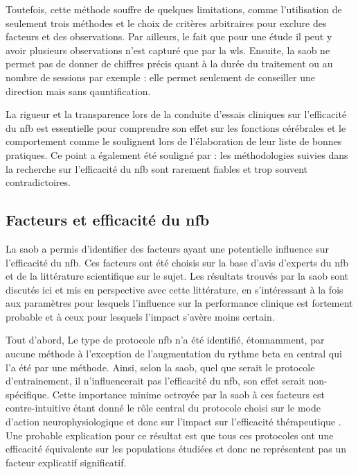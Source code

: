 Toutefois, cette méthode souffre de quelques limitations, comme 
l'utilisation de seulement trois méthodes et le choix de critères arbitraires pour exclure des facteurs et des observations. Par ailleurs, le fait que pour une étude il peut y 
avoir plusieurs observations n'est capturé que par la \gls{wls}. Ensuite, la \gls{saob} ne permet pas de donner de chiffres précis quant à la durée du traitement ou au 
nombre de sessions par exemple : elle permet seulement de conseiller une direction mais sans qauntification.

La rigueur et la transparence lors de la conduite d'essais cliniques sur l'efficacité
du \gls{nfb} est essentielle pour comprendre son effet sur les fonctions cérébrales et le comportement comme le soulignent \citet{Ros2019} lors de l'élaboration
de leur liste de bonnes pratiques. Ce point a également été souligné par \citet{Rogala2016} : les méthodologies suivies dans la recherche sur l'efficacité du
\gls{nfb} sont rarement fiables et trop souvent contradictoires.

\subsection{Facteurs et efficacité du \gls{nfb}} \label{discussion_factors}

La \gls{saob} a permis d'identifier des facteurs ayant une potentielle influence sur l'efficacité du \gls{nfb}. Ces facteurs ont été choisis sur la base d'avis d'experts
du \gls{nfb} et de la littérature scientifique sur le sujet. Les résultats trouvés par la \gls{saob} sont discutés ici et mis en perspective avec cette littérature, en s'intéressant à la fois 
aux paramètres pour lesquels l'influence sur la performance clinique est fortement probable et à ceux pour lesquels l'impact s'avère moins certain. 

Tout d'abord, Le type de protocole \gls{nfb} n'a été identifié, étonnamment, par aucune méthode à l'exception de l'augmentation du rythme beta en central qui l'a été par une méthode. 
Ainsi, selon la \gls{saob}, quel que serait le protocole d'entrainement, il n'influencerait pas l'efficacité du \gls{nfb}, son effet serait non-spécifique. Cette importance 
minime octroyée par la \gls{saob} à ces facteurs est contre-intuitive étant donné le rôle central du protocole choisi sur le mode d'action neurophysiologique 
et donc sur l'impact sur l'efficacité thérapeutique \citep{Vernon2004, Heinrich2019}. Une probable 
explication pour ce résultat est que tous ces protocoles ont une efficacité équivalente sur les populations étudiées et donc ne représentent 
pas un facteur explicatif significatif.
  
